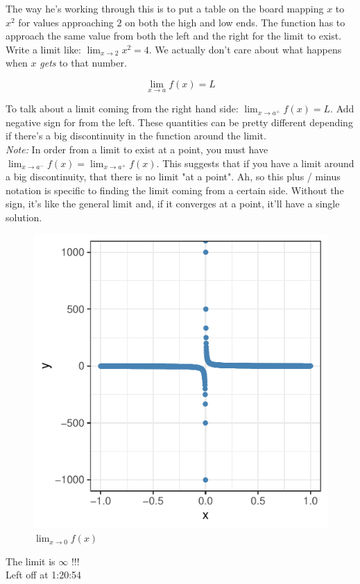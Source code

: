 \documentclass{article}
\begin{document}
The way he's working through this is to put a table on the board mapping $x$ to $x^2$ for
values approaching $2$ on both the high and low ends. The function has to approach the
same value from both the left and the right for the limit to exist. Write a limit like:
$\lim_{x\to 2} x^2 = 4$. We actually don't care about what happens when $x$ \emph{gets} to
that number.

$$
\lim_{x\to a} f(x) = L
$$

To talk about a limit coming from the right hand side: $\lim_{x\to a^+} f(x) = L$. Add
negative sign for from the left. These quantities can be pretty different depending if
there's a big discontinuity in the function around the limit. \\

\emph{Note:} In order from a limit to exist at a point, you must have $\lim_{x \to a^-}
f(x) = \lim_{x \to a^+} f(x).$ This suggests that if you have a limit around a big
discontinuity, that there is no limit "at a point". Ah, so this plus / minus notation is
specific to finding the limit coming from a certain side. Without the sign, it's like the
general limit and, if it converges at a point, it'll have a single solution. 

\begin{figure}[H]
    \centering
    \includegraphics{zero_limit.pdf}
    \caption{$\lim_{x \to 0}f(x)$}
    \label{fig:zero-limit}
\end{figure}


The limit is $\infty$ !!!\\

Left off at 1:20:54
\end{document}
